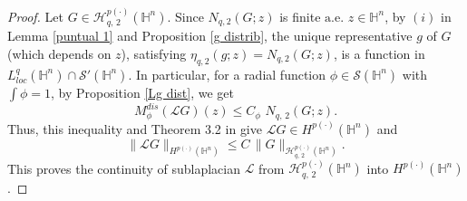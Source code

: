 \documentclass[oneside,10pt]{article}
\begin{document}
\begin{proof} Let $G \in \mathcal{H}^{p(\cdot)}_{q, \, 2}(\mathbb{H}^{n})$. Since $N_{q, 2}(G; z)$ is finite 
$\text{a.e.} \,\, z \in \mathbb{H}^{n}$,  by $(i)$ in Lemma \ref{puntual 1} and Proposition \ref{g distrib}, the unique representative 
$g$ of $G$ (which depends on $z$), satisfying $\eta_{q, 2}(g; z)=N_{q, 2}(G; z)$, is a function in 
$L^{q}_{loc}(\mathbb{H}^{n}) \cap \mathcal{S}'(\mathbb{H}^{n})$. In particular, for a radial function $\phi \in \mathcal{S}(\mathbb{H}^n)$ with $\int \phi = 1$, by Proposition \ref{Lg dist}, we get
\[
M_{\phi}^{dis}(\mathcal{L}G)(z) \leq C_{\phi} \,\, N_{q, \, 2}(G; z).
\]
Thus, this inequality and Theorem 3.2 in \cite{Fang} give $\mathcal{L}G \in H^{p(\cdot)}(\mathbb{H}^{n})$ and 
\begin{equation} \label{continuity}
\| \mathcal{L}G \|_{H^{p(\cdot)}(\mathbb{H}^{n})} \leq C \, \| G \|_{\mathcal{H}^{p(\cdot)}_{q, \, 2}(\mathbb{H}^{n})}.
\end{equation}
This proves the continuity of sublaplacian $\mathcal{L}$ from $\mathcal{H}^{p(\cdot)}_{q, \, 2}(\mathbb{H}^{n})$ into 
$H^{p(\cdot)}(\mathbb{H}^{n})$.


\end{proof}
\end{document}
